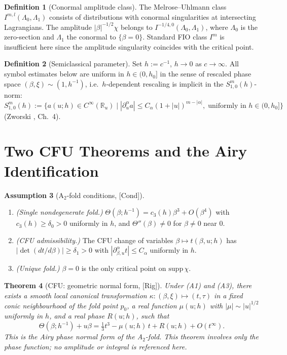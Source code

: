 \documentclass[12pt,a4paper]{amsart}
\newtheorem{theorem}{Theorem}[section]
\theoremstyle{definition}
\newtheorem{definition}[theorem]{Definition}
\newtheorem{assumption}[theorem]{Assumption}
\theoremstyle{remark}
\newcommand{\Rig}{\textup{[Rig]}}
\newcommand{\Cond}{\textup{[Cond]}}
\begin{document}
\begin{definition}[Conormal amplitude class]\label{def:Iml}
The Melrose--Uhlmann class
$I^{m,l}(\Lambda_0,\Lambda_1)$ \cite{MelroseU1979}
consists of distributions with conormal singularities
at intersecting Lagrangians.
The amplitude $|\beta|^{-1/2}\chi$ belongs to
$I^{-1/4,0}(\Lambda_0,\Lambda_1)$,
where $\Lambda_0$ is the zero-section and
$\Lambda_1$ the conormal to $\{\beta=0\}$.
Standard FIO class $I^m$ is insufficient here
since the amplitude singularity coincides with
the critical point.
\end{definition}

\begin{definition}[Semiclassical parameter]\label{def:h}
Set $h:=c^{-1}$, $h\to 0$ as $c\to\infty$.
All symbol estimates below are uniform in $h\in(0,h_0]$
in the sense of rescaled phase space
$(\beta,\xi)\sim(1,h^{-1})$, i.e.\
$h$-dependent rescaling is implicit in the
$S^m_{1,0}(h)$-norm:
\[
  S^m_{1,0}(h) := \bigl\{a(u;h)\in C^\infty(\mathbb{R}_u)
  \;\big|\;
  |\partial_u^\alpha a|\le C_\alpha(1+|u|)^{m-|\alpha|},\;
  \text{uniformly in }h\in(0,h_0]\bigr\}
\]
(Zworski \cite{Zworski2012}, Ch.~4).
\end{definition}

\section{Two CFU Theorems and the Airy Identification}
\label{sec:CFU}

\begin{assumption}[A$_2$-fold conditions, \Cond]
\label{ass:A2}
\begin{enumerate}[\rm(A1)]
\item \textit{(Single nondegenerate fold.)}
  $\Theta(\beta;h^{-1})=c_3(h)\beta^3+O(\beta^4)$
  with $c_3(h)\ge\delta_0>0$ uniformly in $h$,
  and $\Theta''(\beta)\ne 0$ for $\beta\ne 0$ near $0$.
\item \textit{(CFU admissibility.)}
  The CFU change of variables $\beta\mapsto t(\beta,u;h)$
  has $|\det(dt/d\beta)|\ge\delta_1>0$
  with $|\partial^\alpha_{\beta,u}t|\le C_\alpha$
  uniformly in $h$.
\item \textit{(Unique fold.)}
  $\beta=0$ is the only critical point on
  $\mathrm{supp}\,\chi$.
\end{enumerate}
\end{assumption}

\begin{theorem}[CFU: geometric normal form, \Rig]
\label{thm:CFU-geom}
Under (A1) and (A3),
there exists a smooth local canonical transformation
$\kappa:(\beta,\xi)\mapsto(t,\tau)$
in a fixed conic neighbourhood of the fold point $p_0$,
a real function $\mu(u;h)$ with $|\mu|\sim|u|^{1/2}$
uniformly in $h$,
and a real phase $R(u;h)$,
such that
\[
  \Theta(\beta;h^{-1})+u\beta
  = \tfrac{1}{3}t^3-\mu(u;h)\,t+R(u;h)
  +O(t^\infty).
\]
This is the \emph{Airy phase normal form} of the A$_2$-fold.
This theorem involves only the phase function;
no amplitude or integral is referenced here.
\end{theorem}
\end{document}
